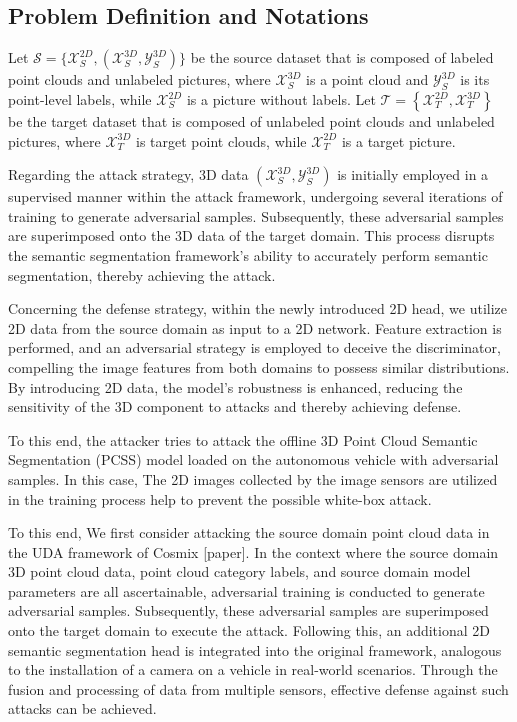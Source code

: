 \documentclass[conference]{IEEEtran}
\begin{document}
\subsection{Problem Definition and Notations}\label{AA}
Let ${\mathcal{S}=\{\mathcal{X}_S^{2D}, (\mathcal{X}_S^{3D}, \mathcal{Y}_S^{3D})\}}$ be the source dataset that is composed of labeled point clouds and unlabeled pictures, where $\mathcal{X}_S^{3D}$ is a point cloud and $\mathcal{Y}_S^{3D}$ is its point-level labels, while $\mathcal{X}_S^{2D}$ is a picture without labels. Let $\mathcal{T}=\left\{\mathcal{X}_T^{2D}, \mathcal{X}_T^{3D}\right\}$ be the target dataset that is composed of unlabeled point clouds and unlabeled pictures, where $\mathcal{X}_T^{3D}$ is target point clouds, while $\mathcal{X}_T^{2D}$ is a target picture.

Regarding the attack strategy, 3D data $(\mathcal{X}_S^{3D}, \mathcal{Y}_S^{3D})$ is initially employed in a supervised manner within the attack framework, undergoing several iterations of training to generate adversarial samples. Subsequently, these adversarial samples are superimposed onto the 3D data of the target domain. This process disrupts the semantic segmentation framework's ability to accurately perform semantic segmentation, thereby achieving the attack.

Concerning the defense strategy, within the newly introduced 2D head, we utilize 2D data from the source domain as input to a 2D network. Feature extraction is performed, and an adversarial strategy is employed to deceive the discriminator, compelling the image features from both domains to possess similar distributions. By introducing 2D data, the model's robustness is enhanced, reducing the sensitivity of the 3D component to attacks and thereby achieving defense.

To this end, the attacker tries to attack the offline 3D Point Cloud Semantic Segmentation (PCSS) model loaded on the autonomous vehicle with adversarial samples. In this case, The 2D images collected by the image sensors are utilized in the training process help to prevent the possible white-box attack. 

To this end, We first consider attacking the source domain point cloud data in the UDA framework of Cosmix [paper]. In the context where the source domain 3D point cloud data, point cloud category labels, and source domain model parameters are all ascertainable, adversarial training is conducted to generate adversarial samples. Subsequently, these adversarial samples are superimposed onto the target domain to execute the attack. Following this, an additional 2D semantic segmentation head is integrated into the original framework, analogous to the installation of a camera on a vehicle in real-world scenarios. Through the fusion and processing of data from multiple sensors, effective defense against such attacks can be achieved.
\end{document}

